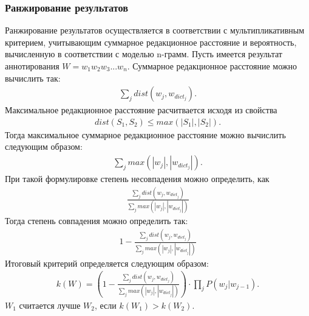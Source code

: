 \subsubsection{Ранжирование результатов}
Ранжирование результатов осуществляется в соответствии с мультипликативным критерием, учитывающим суммарное редакционное расстояние и вероятность, вычисленную в соответствии с моделью n-грамм. Пусть имеется результат аннотирования \(W = w_1w_2w_3...w_n\). Суммарное редакционное расстояние можно вычислить так:
\begin{align}
	\displaystyle\sum_{j} dist(w_j,w_{dict_j}) .
\end{align}
Максимальное редакционное расстояние расчитвается исходя из свойства
\begin{align}
	dist(S_1, S_2) \leq max(|S_1|, |S_2|).
\end{align}
Тогда максимальное суммарное редакционное расстояние можно вычислить следующим образом:
\begin{align}
	\displaystyle\sum_{j} max(|w_j|,|w_{dict_j}|) .
\end{align}
При такой формулировке степень несовпадения можно определить, как
\begin{align}
	\frac{\displaystyle\sum_{j} dist(w_j,w_{dict_j}) }{\displaystyle\sum_{j} max(|w_j|,|w_{dict_j}|) }
\end{align}
Тогда степень совпадения можно определить так:
\begin{align}
	1 - \frac{\displaystyle\sum_{j} dist(w_j,w_{dict_j}) }{\displaystyle\sum_{j} max(|w_j|,|w_{dict_j}|) }
\end{align}
Итоговый критерий определяется следующим образом:
\begin{align}
	k(W) = \left(1 - \frac{\displaystyle\sum_{j} dist(w_j,w_{dict_j}) }{\displaystyle\sum_{j} max(|w_j|,|w_{dict_j}|) }\right) \cdot \prod_{j}P(w_j|w_{j-1}).
\end{align}
\(W_1\) считается лучше \(W_2\), если \(k(W_1) > k(W_2)\).
